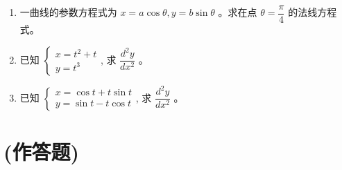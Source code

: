 \documentclass[10pt]{article}
\begin{document}
\begin{enumerate}
  \item 一曲线的参数方程式为 $x=a \cos \theta, y=b \sin \theta$ 。求在点 $\theta=\dfrac{\pi}{4}$ 的法线方程式。
  \item 已知 $\left\{\begin{array}{l}x=t^{2}+t \\ y=t^{3}\end{array}\right.$, 求 $\dfrac{d^{2} y}{d x^{2}}$ 。
  \item 已知 $\left\{\begin{array}{l}x=\cos t+t \sin t \\ y=\sin t-t \cos t\end{array}\right.$, 求 $\dfrac{d^{2} y}{d x^{2}}$ 。
\end{enumerate}

\section*{(作答题)}
\end{document}
